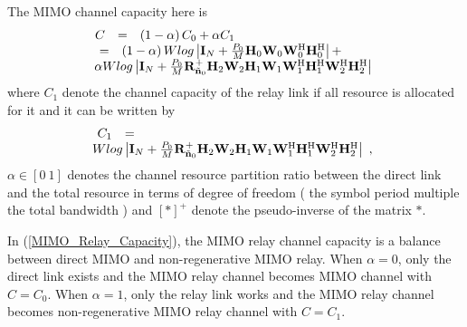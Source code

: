 \documentclass[a4paper,10pt,fleqn, twocolumn]{IEEEtran}
\newcommand{\bn}{{\bf n}}
\newcommand{\bH}{{\bf H}}
\newcommand{\bI}{{\bf I}}
\newcommand{\bR}{{\bf R}}
\newcommand{\bW}{{\bf W}}
\begin{document}
The MIMO channel capacity here is
\begin{equation}\hspace{-0.05in}
\begin{array}{rcl}
C&=& \left(1-\alpha\right)C_{0} +  \alpha C_{1}\\
&\hspace{-0.4in}=&\hspace{-0.2in}\left(1-\alpha\right)
W\mbox{log}\left|\bI_{N}+\frac{P_{0}}{M}\bH_{0}\bW_{0}\bW_{0}^{\rm
H}\bH_{0}^{\rm H}\right|+\\
&&\hspace{-0.50in}\alpha
W\mbox{log}\left|\bI_{N}+\frac{P_{0}}{M}\bR_{\tilde{\bn}_{0}}^{+}\bH_{2}\bW_{2}\bH_{1}\bW_{1}\bW_{1}^{\rm
H}\bH_{1}^{\rm H}\bW_{2}^{\rm H}\bH_{2}^{\rm H}\right|
\end{array}\label{MIMO_Relay_Capacity}
\end{equation}
\noindent where $C_{1}$ denote the channel capacity of the relay
link if all resource is allocated for it and it can be written by
\begin{equation}\hspace{-0.0in}
\begin{array}{rcl}
C_{1}&=&\\
&&\hspace{-0.60in}W\mbox{log}\left|\bI_{N}+\frac{P_{0}}{M}\bR_{\tilde{\bn}_{0}}^{+}\bH_{2}\bW_{2}\bH_{1}\bW_{1}\bW_{1}^{\rm
H}\bH_{1}^{\rm H}\bW_{2}^{\rm H}\bH_{2}^{\rm H}\right|\ ,
\end{array}
\end{equation}
\noindent$\alpha\in\left[0\ 1\right]$ denotes the channel resource
partition ratio between the direct link and the total resource in
terms of degree of freedom ( the symbol period multiple the total
bandwidth ) and $\left[\ast\right]^{+}$ denote the pseudo-inverse
of the matrix $\ast$.

In (\ref{MIMO_Relay_Capacity}), the MIMO relay channel capacity is
a balance between direct MIMO and non-regenerative MIMO relay.
When $\alpha=0$, only the direct link exists and the MIMO relay
channel becomes MIMO channel with $C=C_{0}$. When $\alpha=1$, only
the relay link works and the MIMO relay channel becomes
non-regenerative MIMO relay channel with $C=C_{1}$.
\end{document}
